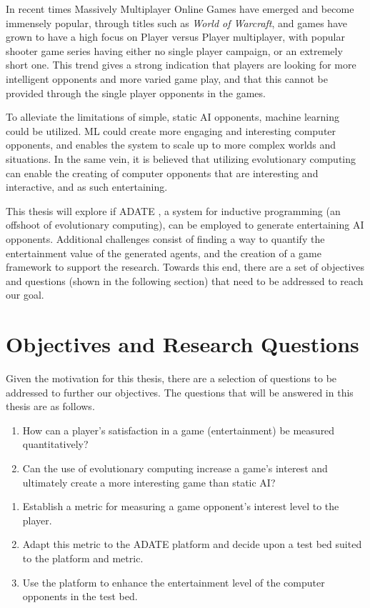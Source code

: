 In recent times Massively Multiplayer Online Games have emerged and become
immensely popular, through titles such as \emph{World of Warcraft}, and games
have grown to have a high focus on Player versus Player multiplayer, with
popular shooter game series having either no single player campaign, or an
extremely short one. This trend gives a strong indication that players are
looking for more intelligent opponents and more varied game play, and that this
cannot be provided through the single player opponents in the games.

To alleviate the limitations of simple, static AI opponents, machine learning
could be utilized. ML could create more engaging and interesting computer
opponents, and enables the system to scale up to more complex worlds and
situations. \citep{funge2004artificial} In the same vein, it is believed that
utilizing evolutionary computing can enable the creating of computer opponents
that are interesting and interactive, and as such
entertaining. \citep{yannakakis2005ai}

This thesis will explore if ADATE \citep{olsson1994inductive}, a system for
inductive programming (an offshoot of evolutionary computing), can be
employed to generate entertaining AI opponents. Additional challenges consist of
finding a way to quantify the entertainment value of the generated agents, and
the creation of a game framework to support the research. Towards this end,
there are a set of objectives and questions (shown in the following section)
that need to be addressed to reach our goal.

\section{Objectives and Research Questions}
\label{sec:objective}

Given the motivation for this thesis, there are a selection of questions to be
addressed to further our objectives. The questions that will be answered in this
thesis are as follows.

\begin{enumerate}
\item How can a player's satisfaction in a game (entertainment) be measured
  quantitatively?
\item Can the use of evolutionary computing increase a game's interest and
  ultimately create a more interesting game than static AI?
\end{enumerate}

\begin{enumerate}
\item Establish a metric for measuring a game opponent's interest level to the
  player.
\item Adapt this metric to the ADATE platform and decide upon a test bed suited
  to the platform and metric. 
\item Use the platform to enhance the entertainment level of the computer
  opponents in the test bed.
\end{enumerate}

